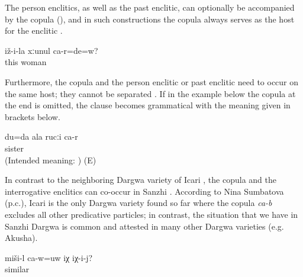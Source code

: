 The person enclitics, as well as the past enclitic, can optionally be accompanied by the copula (), and in such constructions the copula always serves as the host for the enclitic . 

%
\begin{exe}
	\ex	\label{ex:‎‎‎Are you his wife}
	\gll	iž-i-la	xːunul	ca-r=de=w?\\
		this	woman	\\
	\glt	{}
\end{exe}

Furthermore, the copula and the person enclitic or past enclitic need to occur on the same host; they cannot be separated . If in the example below the copula at the end is omitted, the clause becomes grammatical with the meaning given in brackets below. 
%
\begin{exe}
	\ex	\label{ex:It is me who is your sister.}
	\gll	*du=da	ala	rucːi	ca-r\\
				sister	\\
	\glt	(Intended meaning: ) (E)
\end{exe}

In contrast to the neighboring Dargwa variety of Icari \citep[138]{Sumbatova.Mutalov2003}, the copula and the interrogative enclitics can co-occur in Sanzhi . According to Nina Sumbatova (p.c.), Icari is the only Dargwa variety found so far where the copula \textit{ca-b} excludes all other predicative particles; in contrast, the situation that we have in Sanzhi Dargwa is common and attested in many other Dargwa varieties (e.g. Akusha). 

\begin{exe}
	\ex	\label{ex:Is this similar to himSyntax}
	\gll	miši-l	ca-w=uw	iχ	iχ-i-j?\\
		similar		\tsc{dem.down}	\\
	\glt	{}
\end{exe}

